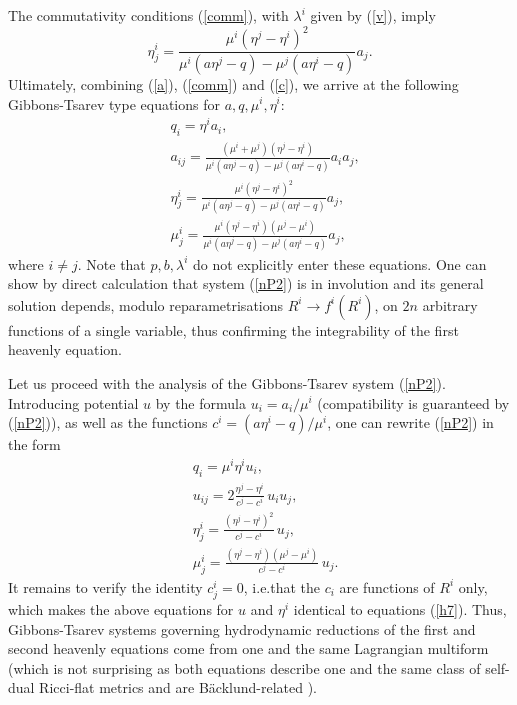 \documentclass[12pt, a4paper]{article}
\theoremstyle{definition}
\begin{document}
The commutativity conditions (\ref{comm}),
with $\lambda^i$ given by (\ref{v}),  imply 
\begin{equation}
\eta^i_j=\frac{\mu^i(\eta^j-\eta^i)^2}{\mu^i(a\eta^j-q)-\mu^j(a\eta^i-q)}a_j.
\label{c}
\end{equation}
Ultimately, combining (\ref{a}), (\ref{comm}) and (\ref{c}), we arrive at the following Gibbons-Tsarev type equations for $a, q, \mu^i, \eta^i$:
\begin{equation}
\begin{split}
& q_i=\eta^ia_i, \\
& a_{ij}=\frac{(\mu^i+\mu^j)(\eta^j-\eta^i)}{\mu^i(a\eta^j-q)-\mu^j(a\eta^i-q)} a_ia_j,  \\
& \eta^i_j=\frac{\mu^i(\eta^j-\eta^i)^2}{\mu^i(a\eta^j-q)-\mu^j(a\eta^i-q)} a_j, \\ &\mu^i_j=\frac{\mu^i(\eta^j-\eta^i)(\mu^j-\mu^i)}{\mu^i(a\eta^j-q)-\mu^j(a\eta^i-q)} a_j,
\label{nP2}
\end{split}
\end{equation}
where $i\ne j$. Note that $p, b, \lambda^i$ do not explicitly enter these equations. One can show by  direct calculation that  system (\ref{nP2}) is in involution and its general solution depends, modulo reparametrisations $R^i\to f^i(R^i)$, on $2n$ arbitrary functions of a single variable, thus confirming the integrability of the first heavenly equation. 


Let us proceed with the analysis of the Gibbons-Tsarev system (\ref{nP2}).  Introducing potential $u$ by the formula
$u_i=a_i/\mu^i$ (compatibility is guaranteed by (\ref{nP2})), as well as the functions $c^i=(a\eta^i-q)/\mu^i$, one can rewrite (\ref{nP2}) in the form
\begin{equation}
\begin{split}
& q_i=\mu^i\eta^iu_i, \\
& u_{ij}=2\frac{\eta^j-\eta^i}{c^j-c^i}\, u_iu_j,  \\
& \eta^i_j=\frac{(\eta^j-\eta^i)^2}{c^j-c^i}\, u_j, \\
&\mu^i_j=\frac{(\eta^j-\eta^i)(\mu^j-\mu^i)}{c^j-c^i}\, u_j .
\label{nP22}
\end{split}
\end{equation}
It remains to  verify the identity $c^i_j=0$, i.e.\@ that the $c_i$ are functions of $R^i$ only, which makes the above equations for $u$ and $\eta^i$ identical to equations (\ref{h7}). Thus, Gibbons-Tsarev systems governing hydrodynamic reductions of the
first and second heavenly equations come from one and the same Lagrangian multiform (which is not surprising as both  equations describe one and the same class of self-dual Ricci-flat metrics and are B\"acklund-related \cite{plebanski1975solutions}).
\end{document}
